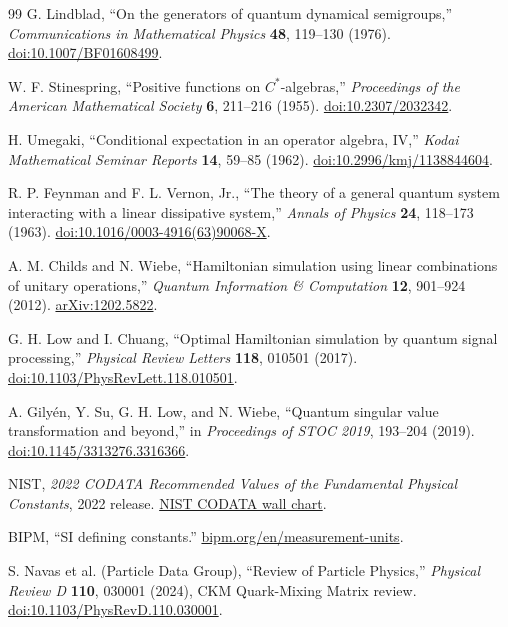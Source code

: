 \documentclass[11pt]{article}
\theoremstyle{definition}
\theoremstyle{remark}
\begin{document}
\begin{thebibliography}{99}
G. Lindblad, ``On the generators of quantum dynamical semigroups,'' \emph{Communications in Mathematical Physics} \textbf{48}, 119--130 (1976). \href{https://doi.org/10.1007/BF01608499}{doi:10.1007/BF01608499}.

W. F. Stinespring, ``Positive functions on $C^*$-algebras,'' \emph{Proceedings of the American Mathematical Society} \textbf{6}, 211--216 (1955). \href{https://doi.org/10.2307/2032342}{doi:10.2307/2032342}.

H. Umegaki, ``Conditional expectation in an operator algebra, IV,'' \emph{Kodai Mathematical Seminar Reports} \textbf{14}, 59--85 (1962). \href{https://doi.org/10.2996/kmj/1138844604}{doi:10.2996/kmj/1138844604}.

R. P. Feynman and F. L. Vernon, Jr., ``The theory of a general quantum system interacting with a linear dissipative system,'' \emph{Annals of Physics} \textbf{24}, 118--173 (1963). \href{https://doi.org/10.1016/0003-4916(63)90068-X}{doi:10.1016/0003-4916(63)90068-X}.

A. M. Childs and N. Wiebe, ``Hamiltonian simulation using linear combinations of unitary operations,'' \emph{Quantum Information \& Computation} \textbf{12}, 901--924 (2012). \href{https://arxiv.org/abs/1202.5822}{arXiv:1202.5822}.

G. H. Low and I. Chuang, ``Optimal Hamiltonian simulation by quantum signal processing,'' \emph{Physical Review Letters} \textbf{118}, 010501 (2017). \href{https://doi.org/10.1103/PhysRevLett.118.010501}{doi:10.1103/PhysRevLett.118.010501}.

A. Gily\'en, Y. Su, G. H. Low, and N. Wiebe, ``Quantum singular value transformation and beyond,'' in \emph{Proceedings of STOC 2019}, 193--204 (2019). \href{https://doi.org/10.1145/3313276.3316366}{doi:10.1145/3313276.3316366}.

NIST, \emph{2022 CODATA Recommended Values of the Fundamental Physical Constants}, 2022 release. \href{https://www.physics.nist.gov/cuu/pdf/wall_2022.pdf}{NIST CODATA wall chart}.

BIPM, ``SI defining constants.'' \href{https://www.bipm.org/en/measurement-units}{bipm.org/en/measurement-units}.

S. Navas et al. (Particle Data Group), ``Review of Particle Physics,'' \emph{Physical Review D} \textbf{110}, 030001 (2024), CKM Quark-Mixing Matrix review. \href{https://doi.org/10.1103/PhysRevD.110.030001}{doi:10.1103/PhysRevD.110.030001}.


\end{thebibliography}
\end{document}
